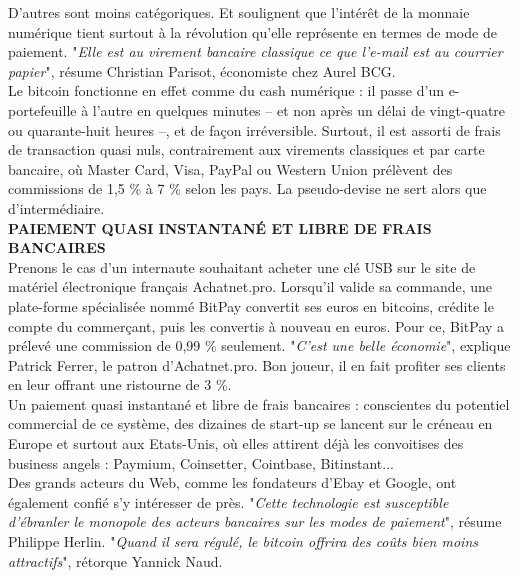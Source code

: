 \documentclass[11pt,twoside,a4paper]{article}
\begin{document}
D'autres sont moins cat{\'e}goriques. Et soulignent que l'int{\'e}r{\^e}t de la monnaie num{\'e}rique tient surtout {\`a} la r{\'e}volution qu'elle repr{\'e}sente en termes de mode de paiement. "\emph{Elle est au virement bancaire classique ce que l'e-mail est au courrier papier}", r{\'e}sume Christian Parisot, {\'e}conomiste chez Aurel BCG. ~\\

Le bitcoin fonctionne en effet comme du cash num{\'e}rique : il passe d'un e-portefeuille {\`a} l'autre en quelques minutes -- et non apr{\`e}s un d{\'e}lai de vingt-quatre ou quarante-huit heures --, et de fa\c{c}on irr{\'e}versible. Surtout, il est assorti de frais de transaction quasi nuls, contrairement aux virements classiques et par carte bancaire, o{\`u} Master Card, Visa, PayPal ou Western Union pr{\'e}l{\`e}vent des commissions de 1,5 \% {\`a} 7 \% selon les pays. La pseudo-devise ne sert alors que d'interm{\'e}diaire. ~\\

\textbf{PAIEMENT QUASI INSTANTAN{\'E} ET LIBRE DE FRAIS BANCAIRES} ~\\

Prenons le cas d'un internaute souhaitant acheter une cl{\'e} USB sur le site de mat{\'e}riel {\'e}lectronique fran\c{c}ais Achatnet.pro. Lorsqu'il valide sa commande, une plate-forme sp{\'e}cialis{\'e}e nomm{\'e} BitPay convertit ses euros en bitcoins, cr{\'e}dite le compte du commer\c{c}ant, puis les convertis {\`a} nouveau en euros. Pour ce, BitPay a pr{\'e}lev{\'e} une commission de 0,99 \% seulement. "\emph{C'est une belle {\'e}conomie}", explique Patrick Ferrer, le patron d'Achatnet.pro. Bon joueur, il en fait profiter ses clients en leur offrant une ristourne de 3 \%. ~\\

Un paiement quasi instantan{\'e} et libre de frais bancaires : conscientes du potentiel commercial de ce syst{\`e}me, des dizaines de start-up se lancent sur le cr{\'e}neau en Europe et surtout aux Etats-Unis, o{\`u} elles attirent d{\'e}j{\`a} les convoitises des business angels : Paymium, Coinsetter, Cointbase, Bitinstant... ~\\

Des grands acteurs du Web, comme les fondateurs d'Ebay et Google, ont {\'e}galement confi{\'e} s'y int{\'e}resser de pr{\`e}s. "\emph{Cette technologie est susceptible d'{\'e}branler le monopole des acteurs bancaires sur les modes de paiement}", r{\'e}sume Philippe Herlin. "\emph{Quand il sera r{\'e}gul{\'e}, le bitcoin offrira des co{\^u}ts bien moins attractifs}", r{\'e}torque Yannick Naud. ~\\
\end{document}

